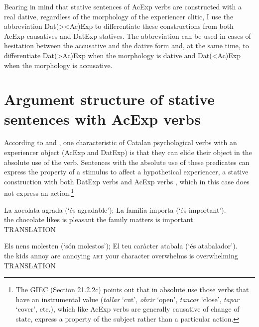 \documentclass[output=paper,modfonts,nonflat,newtxmath]{langsci/langscibook}
\begin{document}
 \z
 \z 

Bearing in mind that stative sentences of AcExp verbs are constructed with a real dative, regardless of the morphology of the experiencer clitic, I use the abbreviation Dat(>{\textbar}<Ac)Exp to differentiate these constructions from both AcExp causatives and DatExp statives. The abbreviation can be used in cases of hesitation between the accusative and the dative form and, at the same time, to differentiate Dat(>Ac)Exp when the morphology is dative and Dat(<Ac)Exp when the morphology is accusative.

\section{Argument structure of stative sentences with AcExp verbs}%

According to \citet[Sections 13.3.6.2a-b and 13.3.7.2b]{Rossello2008} and \citet[21.2.2b and 21.5a]{GIEC2016}, one characteristic of Catalan psychological verbs with an experiencer object (AcExp and DatExp) is that they can elide their object in the absolute use of the verb. Sentences with the absolute use of these predicates can express the property of a stimulus to affect a hypothetical experiencer, a stative construction with both DatExp verbs  and AcExp verbs , which in this case does not express an action.\footnote{The GIEC (Section 21.2.2c) points out that in absolute use those verbs that have an instrumental value (\textit{tallar} ‘cut’, \textit{obrir} ‘open’, \textit{tancar} ‘close’, \textit{tapar} ‘cover’, etc.), which like AcExp verbs are generally causative of change of state, express a property of the subject rather than a particular action.}

\ea%
 \label{ex:royo:18}
 \ea \label{ex:royo:18a}
 \gll La xocolata agrada (‘és agradable’); La família importa (‘és important’). \\
 the chocolate likes is pleasant the family matters is important\\
 \glt TRANSLATION
 
 \ex \label{ex:royo:18b}
 \gll Els nens molesten (‘són molestos’); El teu caràcter atabala (‘és atabalador’).\\
  the kids annoy are annoying \textsc{art} your character overwhelms is overwhelming\\
 \glt  TRANSLATION
 
 \z
 \z
\end{document}
